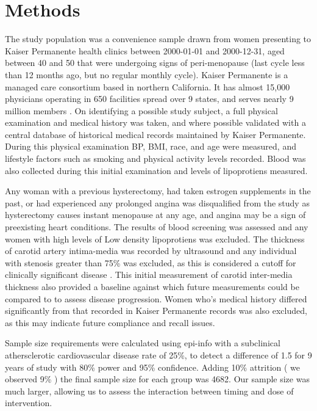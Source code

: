 \documentclass[11pt]{article}
\begin{document}
		\newpage
	\section{Methods} 
		The study population was a convenience sample drawn from women presenting to Kaiser Permanente health clinics between 2000-01-01 and 2000-12-31, aged between 40 and 50 that were undergoing signs of peri-menopause (last cycle less than 12 months ago, but no regular monthly cycle).
		Kaiser Permanente is a managed care consortium based in northern California. It has almost 15,000 physicians operating in 650 facilities spread over 9 states, and serves nearly 9 million members \cite{Rauber}.
		On identifying a possible study subject, a full physical examination and medical history was taken, and where possible validated with a central database of historical medical records maintained by Kaiser Permanente.
		During this physical examination BP, BMI, race, and age were measured, and lifestyle factors such as smoking and physical activity levels recorded.
		Blood was also collected during this initial examination and levels of lipoprotiens measured.


		Any woman with a previous hysterectomy, had taken estrogen supplements in the past, or had experienced any prolonged angina was disqualified from the study as hysterectomy causes instant menopause at any age, and angina may be a sign of preexisting heart conditions.
		The results of blood screening was assessed and any women with high levels of Low density lipoprotiens was excluded.
		The thickness of carotid artery intima-media was recorded  by ultrasound and any individual with stenosis greater than 75\% was excluded, as this is considered a cutoff for clinically significant disease \cite{Maseri2003}. 
		This initial measurement of carotid inter-media thickness also provided a baseline against which future measurements could be compared to to assess disease progression.
		Women who's medical history differed significantly from that recorded in Kaiser Permanente records was also excluded, as this may indicate future compliance and recall issues.
		

		Sample size requirements were calculated using epi-info with a subclinical athersclerotic cardiovascular disease rate of 25\%, to detect a difference of 1.5 for 9 years of study with 80\% power and 95\% confidence.
		Adding 10\% attrition ( we observed 9\% ) the final sample size for each group was 4682. 
		Our sample size was much larger, allowing us to assess the interaction between timing and dose of intervention.
\end{document}
